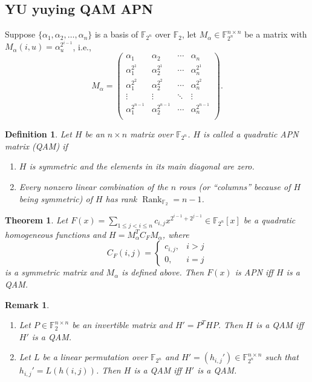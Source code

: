 \documentclass[8pt,oneside]{article}
\newcommand{\0}{\textbf{0}}
\newcommand{\1}{\textbf{1}}
\newcommand{\F}{\mathbb{F}}
\newtheorem{theorem}{Theorem}
\newtheorem{definition}{Definition}
\newtheorem{remark}{Remark}
\begin{document}
\subsection{YU yuying QAM APN}    
    Suppose $\{\alpha_1, \alpha_2, \dots , \alpha_n\}$ is a basis of $\F_{2^n}$ over $\F_2$, let $M_{\alpha}\in\F_{2^n}^{n\times n}$ be a matrix with $M_{\alpha}(i,u)=\alpha_u^{2^{i-1}}$, i.e.,
    \[M_{\alpha}=\begin{pmatrix}
        \alpha_1           & \alpha_2           &\cdots & \alpha_n          \\
        \alpha_1^{2^1}     & \alpha_2^{2^1}     &\cdots & \alpha_n^{2^1}    \\
        \alpha_1^{2^2}     & \alpha_2^{2^2}     &\cdots & \alpha_n^{2^2}    \\
        \vdots             & \vdots             &\ddots & \vdots            \\
        \alpha_1^{2^{n-1}} & \alpha_2^{2^{n-1}} &\cdots & \alpha_n^{2^{n-1}}\\
    \end{pmatrix}.\]
    \begin{definition}
        Let $H$ be an $n\times n$ matrix over $\F_{2^n}$. $H$ is called a quadratic APN matrix (QAM) if 
        \begin{enumerate}[label=(\arabic{*})]
            \item $H$ is symmetric and the elements in its main diagonal are zero.
            \item Every nonzero linear combination of the $n$ rows (or ``columns'' because of $H$ being symmetric) of $H$ has rank $\operatorname{Rank}_{\F_2}=n-1$.
        \end{enumerate}
    \end{definition}
    \begin{theorem}
        Let $F(x)=\sum_{1\le j<i\le n}c_{i,j}x^{2^{i-1}+2^{j-1}}\in\F_{2^n}\left[ x \right]$ be a quadratic homogeneous
        functions and $H=M_{\alpha}^TC_FM_{\alpha}$, where 
        \[C_F(i,j)=\begin{cases}
            c_{i,j}, & i>j\\
            0, & i =j
        \end{cases} \] 
        is a symmetric matrix and $M_{\alpha}$ is defined above.
        Then $F(x)$ is APN iff $H$ is a QAM. 
    \end{theorem}

    \begin{remark}
        \begin{enumerate}[label=(\arabic{*})]
            \item Let $P\in\F_2^{n\times n}$ be an invertible matrix and $H'=P^THP$. Then $H$ is a QAM iff $H'$ is a QAM.
            \item Let $L$ be a linear permutation over $\F_{2^n}$ and $H'=(h_{i,j}')\in\F_{2^n}^{n\times n}$ such that 
            $h_{i,j}'=L(h(i,j))$. Then $H$ is a QAM iff $H'$ is a QAM.
        \end{enumerate}
    \end{remark}
\end{document}
